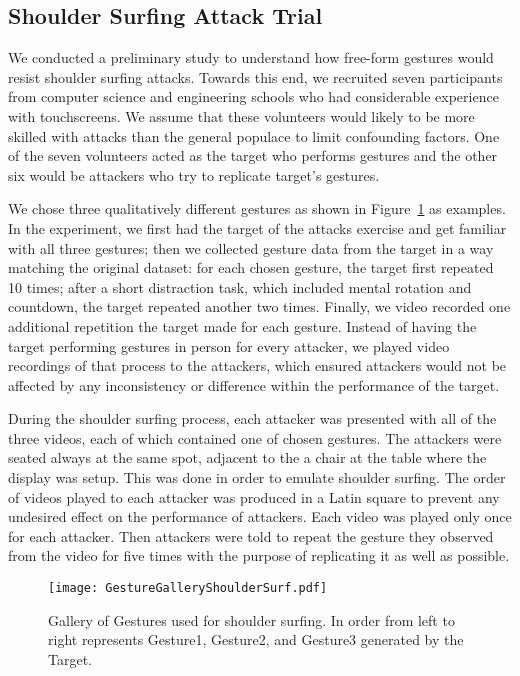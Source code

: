 \documentclass{sig-alternate-10pt}
\begin{document}
\subsection{Shoulder Surfing Attack Trial}

We conducted a preliminary study to understand how free-form gestures would resist shoulder surfing attacks.
Towards this end, we recruited seven participants from computer science and engineering schools who had considerable experience with touchscreens. We assume that these volunteers would likely to be more skilled with attacks than the general populace to limit confounding factors. One of the seven volunteers acted as the target who performs gestures and the other six would be attackers who try to replicate target's gestures.

We chose three qualitatively different gestures as shown in Figure~\ref{fig:ShoulderSurfGallery} as examples.
In the experiment, we first had the target of the attacks exercise and get familiar with all three gestures; then we collected gesture data from the target in a way matching the original dataset: for each chosen gesture, the target first repeated 10 times; after a short distraction task, which included mental rotation and countdown, the target repeated another two times. Finally, we video recorded one additional repetition the target made for each gesture. Instead of having the target performing gestures in person for every attacker, we played video recordings of that process to the attackers, which ensured attackers would not be affected by any inconsistency or difference within the performance of the target.

During the shoulder surfing process, each attacker was presented with all of the three videos, each of which contained one of chosen gestures. The attackers were seated always at the same spot, adjacent to the a chair at the table where the display was setup. This was done in order to emulate shoulder surfing. The order of videos played to each attacker was produced in a Latin square to prevent any undesired effect on the performance of attackers. Each video was played only once for each attacker. Then attackers were told to repeat the gesture they observed from the video for five times with the purpose of replicating it as well as possible. 









\begin{figure}[tbph]
\begin{center}

\texttt{[image: GestureGalleryShoulderSurf.pdf]}
\caption{Gallery of Gestures used for shoulder surfing. In order from left to right represents Gesture1, Gesture2, and Gesture3 generated by the Target.}
\label{fig:ShoulderSurfGallery}
\end{center}
\end{figure}
\end{document}
